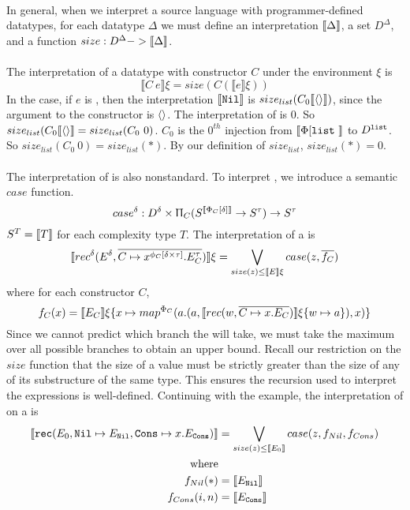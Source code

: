 \paragraph{}
In general, when we interpret a source language with programmer-defined
datatypes, for each datatype $\Delta$ we must define an interpretation $\llbracket
\Delta \rrbracket$, a set $D^\Delta$, and a function $size : D^\Delta -> \llbracket \Delta
\rrbracket$.


\paragraph{}
The interpretation of a datatype with constructor $C$ under the environment
$\xi$ is
%
\[
  \llbracket C\ e\rrbracket \xi = size(C (\llbracket e \rrbracket \xi))
\]
%
In the  case, if $e$ is , then the interpretation $\llbracket \texttt{Nil}
\rrbracket$ is $size_{list}(C_0 \llbracket\langle\rangle\rrbracket)$, since the argument to the 
constructor is $\langle\rangle$. The interpretation of  is $0$. So
$size_{list}(C_0 \llbracket\langle\rangle\rrbracket = size_{list}(C_0\ 0)$. $C_0$ is the $0^{th}$
injection from $\llbracket \Phi[\texttt{list}\ \rrbracket$ to $D^{\texttt{list}}$.  So
$size_{list}(C_0\ 0) = size_{list}(\ast)$. By our definition of
$size_{list}$, $size_{list}(\ast) = 0$.


\paragraph{}
The interpretation of  is also nonstandard. To interpret , we
introduce a semantic $case$ function.
%
\[
  case^\delta : D^\delta \times \Uppi_{C} (S^{\llbracket \Phi_C[\delta]\rrbracket} \to S^\tau) \to S^\tau
\]
%
$S^T = \llbracket T \rrbracket$ for each complexity type $T$. The interpretation of a  is
%
\[
  \llbracket rec^\delta(E^\delta, \overline{C \mapsto x^{\phi_C[\delta \times \tau]}.E_C^\tau}) \rrbracket \xi = \bigvee\limits_{size(z) \leq \llbracket E \rrbracket \xi} case(z, \overline{f_C})
\]
%
where for each constructor $C$,
%
\[
  f_C(x) = \llbracket E_C \rrbracket \xi \{ x \mapsto map^{\Phi_C}(a.(a, \llbracket rec(w, \overline{C \mapsto x.E_C})\rrbracket \xi \{ w \mapsto a \}), x) \}
\]
%
Since we cannot predict which branch the  will take, we must take the
maximum over all possible branches to obtain an upper bound. Recall our
restriction on the $size$ function that the size of a value must be strictly
greater than the size of any of its substructure of the same type. This ensures
the recursion used to interpret the  expressions is well-defined.
Continuing with the  example, the interpretation of  on a  is
%
\begin{align*}
  \llbracket\texttt{rec}(E_0, \texttt{Nil} \mapsto E_{\texttt{Nil}}, \texttt{Cons} \mapsto x.E_{\texttt{Cons}})\rrbracket &= \bigvee\limits_{size(z) \leq \llbracket E_0 \rrbracket} case(z, f_{Nil}, f_{Cons}) \\
  \text{where} \\
  f_{Nil}(\ast) &= \llbracket E_{\texttt{Nil}} \rrbracket \\
  f_{Cons}(i,n) &= \llbracket E_{\texttt{Cons}} \rrbracket
\end{align*}
